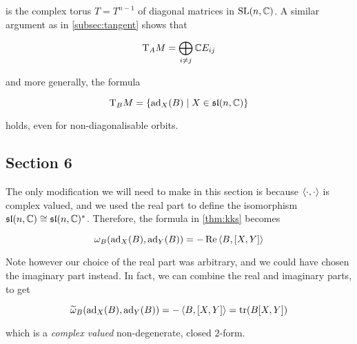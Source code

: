 \documentclass{article}
\renewcommand{\sl}{\mathfrak{sl}}
\renewcommand{\tilde}{\widetilde}
\begin{document}
is the complex torus \(T = T^{n-1}\) of diagonal matrices in \(\operatorname{SL}(n, \mathbb{C})\). A similar argument as in \cref{subsec:tangent} shows that

\[\mathrm{T}_A M = \bigoplus_{i \ne j}\mathbb{C} E_{ij}\]

and more generally, the formula

\[\TT_B M = \left\{\ad_X(B) \mid X \in \sl(n, \C)\right\}\]

holds, even for non-diagonalisable orbits.

\subsection*{Section 6}

The only modification we will need to make in this section is because \(\left\langle \cdot, \cdot \right\rangle\) is complex valued, and we used the real part to define the isomorphism \(\sl(n, \C) \cong \sl(n, \C)^*\). Therefore, the formula in \cref{thm:kks} becomes

\[\omega_B(\operatorname{ad}_X(B), \operatorname{ad}_Y(B)) = -\Re\left\langle B, [X, Y] \right\rangle\]

Note however our choice of the real part was arbitrary, and we could have chosen the imaginary part instead. In fact, we can combine the real and imaginary parts, to get

\[\tilde \omega_B(\ad_X(B), \ad_Y(B)) = -\inner{B, [X, Y]} = \tr(B[X,Y])\]

which is a \emph{complex valued} non-degenerate, closed \(2\)-form.


\end{document}
